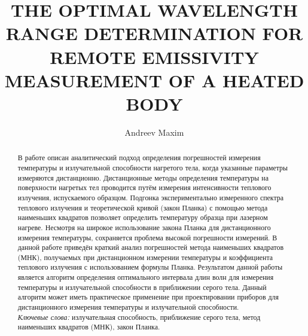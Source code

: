 \begin{abstract}%

В работе описан аналитический подход определения погрешностей измерения температуры и излучательной способности нагретого тела, когда указанные параметры измеряются дистанционно. Дистанционные методы определения температуры на поверхности нагретых тел проводится путём измерения интенсивности теплового излучения, испускаемого образцом. Подгонка экспериментально измеренного спектра теплового излучения и теоретической кривой  (закон Планка) с помощью метода наименьших квадратов позволяет определить температуру образца при лазерном нагреве.  Несмотря на широкое использование закона Планка для дистанционного измерения температуры, сохраняется проблема высокой погрешности измерений. В данной работе приведён краткий анализ погрешностей метода наименьших квадратов (МНК), получаемых при дистанционном измерении температуры и коэффициента теплового излучения с использованием формулы Планка. Результатом данной работы является алгоритм определения оптимального интервала длин волн для измерения температуры и излучательной способности в приближении серого тела. Данный алгоритм может иметь практическое применение при проектировании приборов для дистанционного измерения температуры и излучательной способности.\\
\emph{Ключевые слова:} {излучательная способность, приближение серого тела, метод наименьших квадратов (МНК), закон Планка.}
\end{abstract}



\bigskip

\title{\uppercase{THE OPTIMAL WAVELENGTH RANGE DETERMINATION FOR REMOTE EMISSIVITY MEASUREMENT OF A HEATED BODY}} %

\author{Andreev Maxim} %

\address{Moscow Lomonosov State University}

